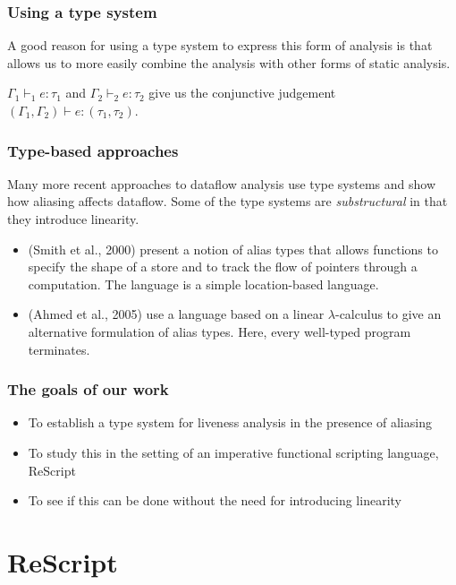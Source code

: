 \documentclass{beamer}
\begin{document}
\begin{frame}
  \frametitle{Using a type system}

  A good reason for using a type system to express this form of
  analysis is that allows us to more easily combine the analysis with
  other forms of static analysis.

  $\Gamma_1 \vdash_1 e : \tau_1$ and $\Gamma_2 \vdash_2 e : \tau_2$
  give us the conjunctive judgement $(\Gamma_1,\Gamma_2) \vdash e :
  (\tau_1,\tau_2)$.
  
\end{frame}

\begin{frame}
  \frametitle{Type-based approaches}

  Many more recent approaches to dataflow analysis use type systems
  and show how aliasing affects dataflow. Some of the type systems are
  \emph{substructural} in that they introduce linearity.
  
  \begin{itemize}
  \item (Smith et al., 2000) present a notion of alias types that allows
    functions to specify the shape of a store and to track the flow of
    pointers through a computation. The language is a simple
    location-based language.
  \item (Ahmed et al., 2005) use a language based on a linear
    $\lambda$-calculus to give an alternative formulation of alias
    types. Here, every well-typed program terminates.
  \end{itemize}
\end{frame}

\begin{frame}
  \frametitle{The goals of our work}

  \begin{itemize}
  \item To establish a type system for liveness analysis in the
    presence of aliasing
  \item To study this in the setting of an imperative functional
    scripting language, ReScript
  \item To see if this can be done without the need for introducing linearity
  \end{itemize}
\end{frame}

\section{ReScript}
\end{document}
